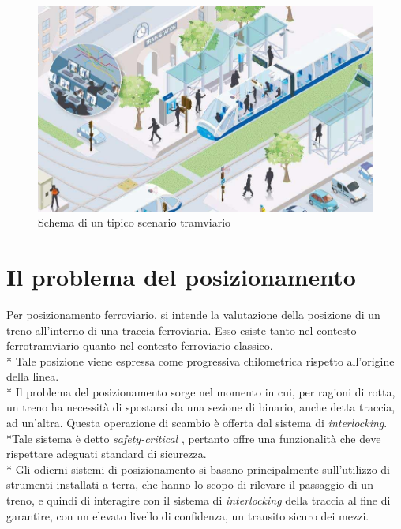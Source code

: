 \begin{figure}[h]
		\centering
		\includegraphics[width=0.7\linewidth]{img/twschema}
		\caption{Schema di un tipico scenario tramviario}
		\label{fig:tramschema}
\end{figure}
\section{Il problema del posizionamento}
Per posizionamento ferroviario, si intende la valutazione della posizione di un treno all'interno di una traccia ferroviaria. \cite{trainpositioning} Esso esiste tanto nel contesto ferrotramviario quanto nel contesto ferroviario classico.\\*
Tale posizione viene espressa come progressiva chilometrica rispetto all'origine della linea.\\*
Il problema del posizionamento sorge nel momento in cui, per ragioni di rotta, un treno ha necessit\`a di spostarsi da una sezione di binario, anche detta traccia, ad un'altra. Questa operazione di scambio \`e offerta dal sistema di \emph{interlocking}. \cite{interlockingsystems}  \cite{interlocking}\\*Tale sistema \`e detto \emph{safety-critical} \cite{safetycritical}, pertanto offre una funzionalit\`a che deve rispettare adeguati standard di sicurezza. \cite{50128} \cite{MISRA} \\*
Gli odierni sistemi di posizionamento si basano principalmente sull'utilizzo di strumenti installati a terra, che hanno lo scopo di rilevare il passaggio di un treno, e quindi di interagire con il sistema di \emph{interlocking} della traccia al fine di garantire, con un elevato livello di confidenza, un transito sicuro dei mezzi.\cite{tecnicheodierne}
